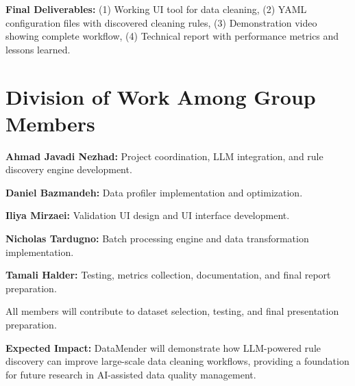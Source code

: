 \documentclass[11pt]{article}
\begin{document}
\textbf{Final Deliverables:} (1) Working UI tool for data cleaning, (2) YAML configuration files with discovered cleaning rules, (3) Demonstration video showing complete workflow, (4) Technical report with performance metrics and lessons learned.

\section{\color{primaryblue}Division of Work Among Group Members}

\textbf{Ahmad Javadi Nezhad:} Project coordination, LLM integration, and rule discovery engine development.

\textbf{Daniel Bazmandeh:} Data profiler implementation and optimization.

\textbf{Iliya Mirzaei:} Validation UI design and UI interface development.

\textbf{Nicholas Tardugno:} Batch processing engine and data transformation implementation.

\textbf{Tamali Halder:} Testing, metrics collection, documentation, and final report preparation.

All members will contribute to dataset selection, testing, and final presentation preparation.

\textbf{Expected Impact:} DataMender will demonstrate how LLM-powered rule discovery can improve large-scale data cleaning workflows, providing a foundation for future research in AI-assisted data quality management.
\end{document}
